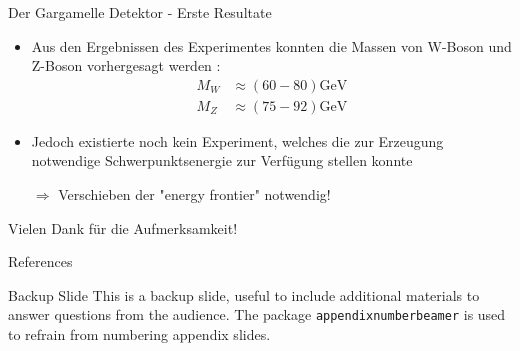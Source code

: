 \documentclass[aspectratio=1610, professionalfonts, 10pt]{beamer}
\begin{document}
\begin{frame}{Der Gargamelle Detektor - Erste Resultate}
		\begin{itemize}
			\setlength\itemsep{0.5em}
			\item Aus den Ergebnissen des Experimentes konnten die Massen von W-Boson und Z-Boson vorhergesagt werden \cite{doi:10.1142/9789814644150_0006}:
			\begin{align*}
				M_W &\approx \left(60-80\right)\si{\giga\electronvolt}\\
				M_Z &\approx \left(75-92\right)\si{\giga\electronvolt}
			\end{align*}
			\item Jedoch existierte noch kein Experiment, welches die zur Erzeugung notwendige Schwerpunktsenergie zur Verfügung stellen konnte
			\item[$\Rightarrow$]Verschieben der "energy frontier" notwendig!

		\end{itemize}
		\end{frame}

%

\begin{frame}[focus]
	Vielen Dank für die Aufmerksamkeit!
\end{frame}


\appendix

\begin{frame}[allowframebreaks]{References}
	
	
\end{frame}


\begin{frame}{Backup Slide}
	This is a backup slide, useful to include additional materials to answer questions from the audience.
	\vfill
	The package \texttt{appendixnumberbeamer} is used to refrain from numbering appendix slides.
\end{frame}

\end{document}
